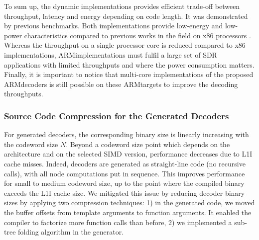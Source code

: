 To sum up, the dynamic implementations provides efficient trade-off between
throughput, latency and energy depending on code length. It was demonstrated by
previous benchmarks. Both implementations provide low-energy and low-power
characteristics compared to previous works in the field on x86 processors
\cite{Sarkis2014,Giard2014,Sarkis2014a,LeGal2014,LeGal2015a,Cassagne2015c}.
Whereas the throughput on a single processor core is reduced compared to x86
implementations, ARM\R implementations must fulfil a large set of SDR
applications with limited throughputs and where the power consumption matters.
Finally, it is important to notice that multi-core implementations of the
proposed ARM\R decoders is still possible on these ARM\R targets to improve the
decoding throughputs.

\subsubsection{Source Code Compression for the Generated Decoders}

For generated decoders, the corresponding binary size is linearly increasing
with the codeword size $N$. Beyond a codeword size point which depends on the
architecture and on the selected SIMD version, performance decreases due to L1I
cache misses. Indeed, decoders are generated as straight-line code (no recursive
calls), with all node computations put in sequence. This improves performance
for small to medium codeword size, up to the point where  the compiled binary
exceeds the L1I cache size.
We mitigated this issue by reducing decoder binary sizes by applying two
compression techniques: 1) in the generated code, we moved the buffer offsets
from template arguments to function arguments. It enabled the compiler to
factorize more function calls than before, 2) we implemented a sub-tree folding
algorithm in the generator.

